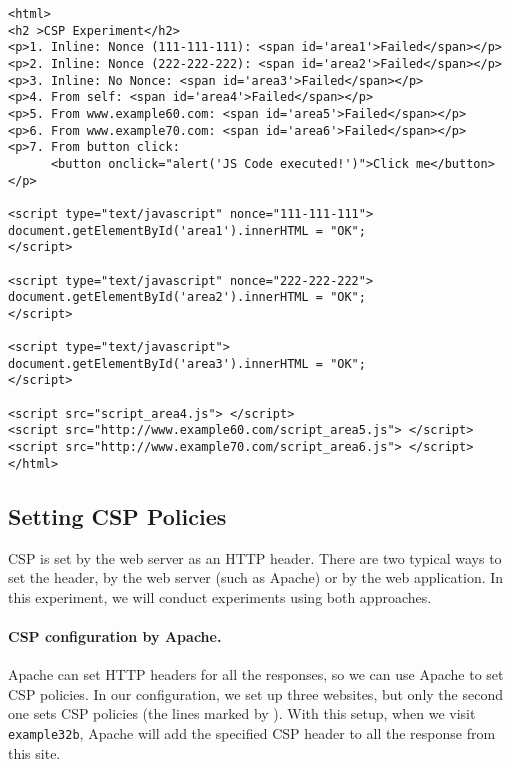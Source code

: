 \begin{lstlisting}[caption={The experiment web page \texttt{index.html}}]
<html>
<h2 >CSP Experiment</h2>
<p>1. Inline: Nonce (111-111-111): <span id='area1'>Failed</span></p>
<p>2. Inline: Nonce (222-222-222): <span id='area2'>Failed</span></p>
<p>3. Inline: No Nonce: <span id='area3'>Failed</span></p>
<p>4. From self: <span id='area4'>Failed</span></p>
<p>5. From www.example60.com: <span id='area5'>Failed</span></p>
<p>6. From www.example70.com: <span id='area6'>Failed</span></p>
<p>7. From button click: 
      <button onclick="alert('JS Code executed!')">Click me</button></p>

<script type="text/javascript" nonce="111-111-111">
document.getElementById('area1').innerHTML = "OK";
</script>

<script type="text/javascript" nonce="222-222-222">
document.getElementById('area2').innerHTML = "OK";
</script>

<script type="text/javascript">
document.getElementById('area3').innerHTML = "OK";
</script>

<script src="script_area4.js"> </script>
<script src="http://www.example60.com/script_area5.js"> </script>
<script src="http://www.example70.com/script_area6.js"> </script>
</html>

\end{lstlisting}
 


\subsection{Setting CSP Policies}  

CSP is set by the web server as 
an HTTP header. There are two typical ways to set the header, 
by the web server (such as Apache) or by the web application. 
In this experiment, we will conduct experiments using 
both approaches. 

\paragraph{CSP configuration by Apache.}
Apache can set HTTP headers for all the responses, so we can
use Apache to set CSP policies. In our configuration, 
we set up three websites, but only the second one sets 
CSP policies (the lines marked by ). 
With this setup, when we visit \texttt{example32b}, 
Apache will add the specified CSP header to all 
the response from this site. 


